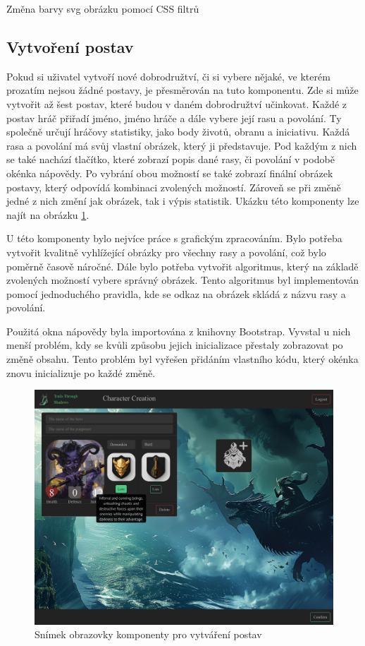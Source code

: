 \begin{listing}[H]
  \inputminted[breaklines]{css}{resources/code/svg_color.css}
  \caption{Změna barvy svg obrázku pomocí CSS filtrů}
  \label{code:svg_filter}
\end{listing}

\subsection{Vytvoření postav}
Pokud si uživatel vytvoří nové dobrodružtví, či si vybere nějaké, ve kterém prozatím nejsou žádné postavy, je přesměrován na tuto komponentu. Zde si může vytvořit až šest postav, které budou v daném dobrodružtví učinkovat. Každé z postav hráč přiřadí jméno, jméno hráče a dále vybere její rasu a povolání. Ty společně určují hráčovy statistiky, jako body životů, obranu a iniciativu. Každá rasa a povolání má svůj vlastní obrázek, který ji představuje. Pod každým z nich se také nachází tlačítko, které zobrazí popis dané rasy, či povolání v podobě okénka nápovědy. Po vybrání obou možností se také zobrazí finální obrázek postavy, který odpovídá kombinaci zvolených možností. Zároveň se při změně jedné z nich změní jak obrázek, tak i výpis statistik. Ukázku této komponenty lze najít na obrázku \ref{fig:character-creation}.

U této komponenty bylo nejvíce práce s grafickým zpracováním. Bylo potřeba vytvořit kvalitně vyhlížející obrázky pro všechny rasy a povolání, což bylo poměrně časově náročné. Dále bylo potřeba vytvořit algoritmus, který na základě zvolených možností vybere správný obrázek. Tento algoritmus byl implementován pomocí jednoduchého pravidla, kde se odkaz na obrázek skládá z názvu rasy a povolání.

Použitá okna nápovědy byla importována z knihovny Bootstrap. Vyvstal u nich menší problém, kdy se kvůli způsobu jejich inicializace přestaly zobrazovat po změně obsahu. Tento problém byl vyřešen přidáním vlastního kódu, který okénka znovu inicializuje po každé změně.

\begin{figure}[H]
  \centering
  \includegraphics[width=.95\textwidth]{resources/figures/TTS-Charracter Creation.png}
  \caption{Snímek obrazovky komponenty pro vytváření postav}
  \label{fig:character-creation}
\end{figure}

